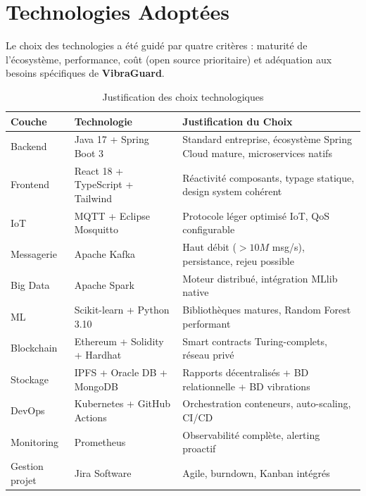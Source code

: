 \documentclass[12pt, a4paper, oneside]{report}
\newcommand{\projectname}{\textbf{VibraGuard}}
\begin{document}
\section{Technologies Adoptées}

Le choix des technologies a été guidé par quatre critères : maturité de l'écosystème,
performance, coût (open source prioritaire) et adéquation aux besoins spécifiques de
\projectname{}.

\begin{table}[H]
  \centering
  \begin{tabularx}{\textwidth}{L{2.2cm} L{3.8cm} L{5.5cm}}
    \toprule
    \textbf{Couche} &
    \textbf{Technologie} &
    \textbf{Justification du Choix} \\
    \midrule
    Backend & Java 17 + Spring Boot 3 & Standard entreprise, écosystème Spring Cloud mature,
    microservices natifs \\
    Frontend & React 18 + TypeScript + Tailwind & Réactivité composants, typage statique,
    design system cohérent \\
    IoT & MQTT + Eclipse Mosquitto & Protocole léger optimisé IoT, QoS configurable \\
    Messagerie & Apache Kafka & Haut débit ($>10M$ msg/s), persistance, rejeu possible \\
    Big Data & Apache Spark & Moteur distribué, intégration MLlib native \\
    ML & Scikit-learn + Python 3.10 & Bibliothèques matures, Random Forest performant \\
    Blockchain & Ethereum + Solidity + Hardhat & Smart contracts Turing-complets, réseau privé \\
    Stockage & IPFS + Oracle DB + MongoDB & Rapports décentralisés + BD relationnelle + BD vibrations \\
    DevOps & Kubernetes + GitHub Actions & Orchestration conteneurs, auto-scaling, CI/CD \\
    Monitoring & Prometheus & Observabilité complète, alerting proactif \\
    Gestion projet & Jira Software & Agile, burndown, Kanban intégrés \\
    \bottomrule
  \end{tabularx}
  \caption{Justification des choix technologiques}
\end{table}
\end{document}

